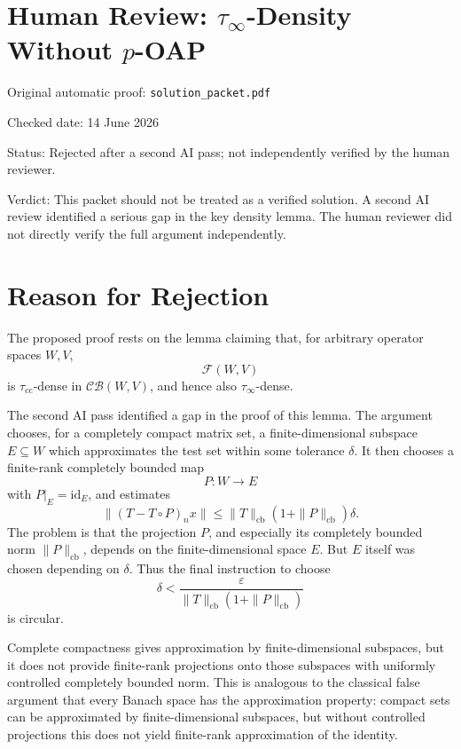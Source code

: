 \documentclass[11pt]{article}
\begin{document}
\section*{Human Review: \(\tau_\infty\)-Density Without \(p\)-OAP}

\noindent Original automatic proof: \texttt{solution\_packet.pdf}

\noindent Checked date: 14 June 2026

\noindent Status: Rejected after a second AI pass; not independently verified by the human reviewer.

\noindent Verdict: This packet should not be treated as a verified solution. A second AI review identified a serious gap in the key density lemma. The human reviewer did not directly verify the full argument independently.

\section*{Reason for Rejection}

The proposed proof rests on the lemma claiming that, for arbitrary operator spaces \(W,V\),
\[
\mathcal F(W,V)
\]
is \(\tau_{\mathrm{cc}}\)-dense in \(\mathcal{CB}(W,V)\), and hence also \(\tau_\infty\)-dense.

The second AI pass identified a gap in the proof of this lemma. The argument chooses, for a completely compact matrix set, a finite-dimensional subspace \(E\subseteq W\) which approximates the test set within some tolerance \(\delta\). It then chooses a finite-rank completely bounded map
\[
P:W\to E
\]
with \(P|_E=\mathrm{id}_E\), and estimates
\[
\|(T-T\circ P)_n x\|
\leq
\|T\|_{\mathrm{cb}}(1+\|P\|_{\mathrm{cb}})\delta.
\]
The problem is that the projection \(P\), and especially its completely bounded norm \(\|P\|_{\mathrm{cb}}\), depends on the finite-dimensional space \(E\). But \(E\) itself was chosen depending on \(\delta\). Thus the final instruction to choose
\[
\delta < \frac{\varepsilon}{\|T\|_{\mathrm{cb}}(1+\|P\|_{\mathrm{cb}})}
\]
is circular.

Complete compactness gives approximation by finite-dimensional subspaces, but it does not provide finite-rank projections onto those subspaces with uniformly controlled completely bounded norm. This is analogous to the classical false argument that every Banach space has the approximation property: compact sets can be approximated by finite-dimensional subspaces, but without controlled projections this does not yield finite-rank approximation of the identity.
\end{document}
